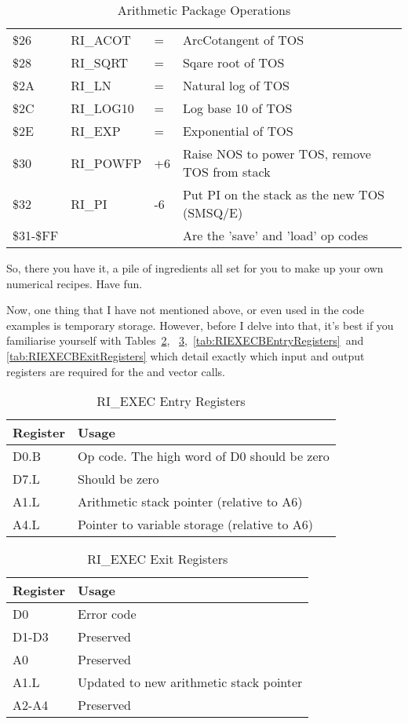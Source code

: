 \begin{table}[htbp]
\begin{tabular}{l l l l}
\$26 & RI\_ACOT  &  = & ArcCotangent of TOS \\
\$28 & RI\_SQRT  &  = & Sqare root of TOS \\
\$2A & RI\_LN    &  = & Natural log of TOS \\
\$2C & RI\_LOG10 &  = & Log base 10 of TOS \\
\$2E & RI\_EXP   &  = & Exponential of TOS \\
\$30 & RI\_POWFP & +6 & Raise NOS to power TOS, remove TOS from stack \\
\$32 & RI\_PI    & -6 & Put PI on the stack as the new TOS (SMSQ/E) \\
\$31-\$FF & & & Are the ’save’ and ’load’ op codes \\
%
\bottomrule
\end{tabular}
\caption{Arithmetic Package Operations}
\label{tab:ArithmeticPackageOperations}
\end{table}

So, there you have it, a pile of ingredients all set for you to make
    up your own numerical recipes. Have fun.

Now, one thing that I have not mentioned above, or even used in the
    code examples is temporary storage. However, before I delve into that,
    it's best if you familiarise yourself with Tables~\ref{tab:RIEXECEntryRegisters},~ \ref{tab:RIEXECExitRegisters},~\ref{tab:RIEXECBEntryRegisters}~and~ \ref{tab:RIEXECBExitRegisters} which detail exactly which input and output registers are
    required for the  and  vector calls.

\begin{table}[htbp]
\centering
\begin{tabular}{l l}
\toprule
\textbf{Register} & \textbf{Usage} \\
\midrule
%
D0.B & Op code. The high word of D0 should be zero \\
D7.L & Should be zero \\
A1.L & Arithmetic stack pointer (relative to A6) \\
A4.L & Pointer to variable storage (relative to A6) \\
%
\bottomrule
\end{tabular}
\caption{RI\_EXEC Entry Registers}
\label{tab:RIEXECEntryRegisters}
\end{table}

\begin{table}[htbp]
\centering
\begin{tabular}{l l}
\toprule
\textbf{Register} & \textbf{Usage} \\
\midrule
%
D0    & Error code \\
D1-D3 & Preserved \\
A0    & Preserved \\
A1.L  & Updated to new arithmetic stack pointer \\
A2-A4 & Preserved \\
%
\bottomrule
\end{tabular}
\caption{RI\_EXEC Exit Registers}
\label{tab:RIEXECExitRegisters}
\end{table}


